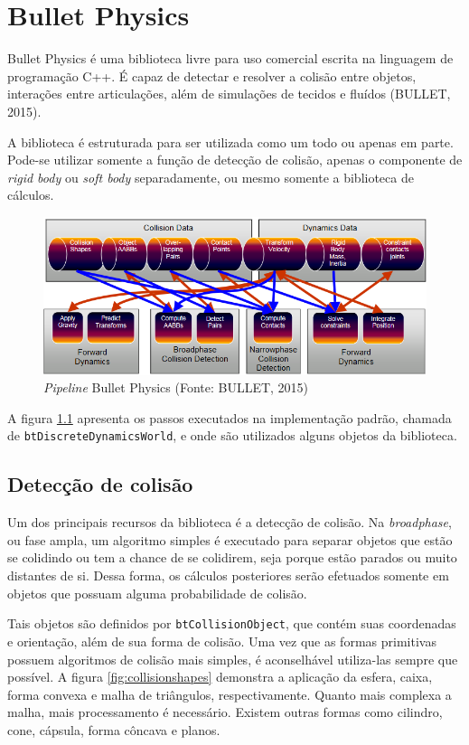 \chapter{Bullet Physics}

Bullet Physics é uma biblioteca livre para uso comercial escrita na linguagem de programação C++. É capaz de detectar e resolver a colisão entre objetos, interações entre articulações, além de simulações de tecidos e fluídos (BULLET, 2015).

A biblioteca é estruturada para ser utilizada como um todo ou apenas em parte. Pode-se utilizar somente a função de detecção de colisão, apenas o componente de \textit{rigid body} ou \textit{soft body} separadamente, ou mesmo somente a biblioteca de cálculos.

\begin{figure}[H]
	\centering
	\includegraphics[scale=0.7]{imagens/bullet-pipeline.png}
	\caption{\small \textit{Pipeline} Bullet Physics (Fonte: BULLET, 2015)}
	\label{fig:bulletpipeline}
\end{figure}

A figura \ref{fig:bulletpipeline} apresenta os passos executados na implementação padrão, chamada de \lstinline{btDiscreteDynamicsWorld}, e onde são utilizados alguns objetos da biblioteca.

\section{Detecção de colisão}

Um dos principais recursos da biblioteca é a detecção de colisão. Na \textit{broadphase}, ou fase ampla, um algoritmo simples é executado para separar objetos que estão se colidindo ou tem a chance de se colidirem, seja porque estão parados ou muito distantes de si. Dessa forma, os cálculos posteriores serão efetuados somente em objetos que possuam alguma probabilidade de colisão.

Tais objetos são definidos por \lstinline{btCollisionObject}, que contém suas coordenadas e orientação, além de sua forma de colisão. Uma vez que as formas primitivas possuem algoritmos de colisão mais simples, é aconselhável utiliza-las sempre que possível. A figura \ref{fig:collisionshapes} demonstra a aplicação da esfera, caixa, forma convexa e malha de triângulos, respectivamente. Quanto mais complexa a malha, mais processamento é necessário. Existem outras formas como cilindro, cone, cápsula, forma côncava e planos.


